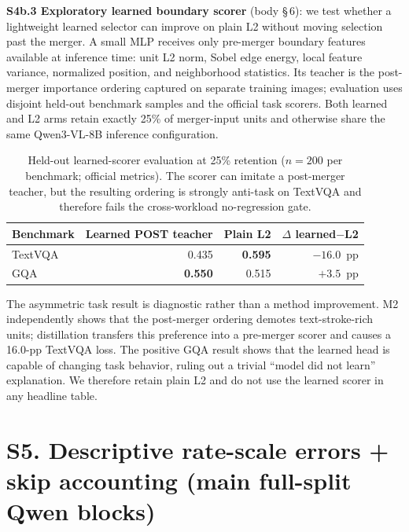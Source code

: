 \noindent\textbf{S4b.3 Exploratory learned boundary scorer} (body \S\,6):
we test whether a lightweight learned selector can improve on plain L2 without
moving selection past the merger. A small MLP receives only pre-merger
boundary features available at inference time: unit L2 norm, Sobel edge energy,
local feature variance, normalized position, and neighborhood statistics. Its
teacher is the post-merger importance ordering captured on separate training
images; evaluation uses disjoint held-out benchmark samples and the official
task scorers. Both learned and L2 arms retain exactly 25\% of merger-input
units and otherwise share the same Qwen3-VL-8B inference configuration.

\begin{table}[ht]
  \centering
  \small
  \begin{tabular}{@{}l r r r@{}}
    \toprule
    Benchmark & Learned POST teacher & Plain L2 & $\Delta$ learned$-$L2 \\
    \midrule
    TextVQA & 0.435 & \textbf{0.595} & $-16.0$~pp \\
    GQA     & \textbf{0.550} & 0.515 & $+3.5$~pp \\
    \bottomrule
  \end{tabular}
  \caption{Held-out learned-scorer evaluation at 25\% retention
  ($n=200$ per benchmark; official metrics). The scorer can imitate a
  post-merger teacher, but the resulting ordering is strongly anti-task on
  TextVQA and therefore fails the cross-workload no-regression gate.}
  \label{tab:supp_learned}
\end{table}

The asymmetric task result is diagnostic rather than a method improvement.
M2 independently shows that the post-merger ordering demotes
text-stroke-rich units; distillation transfers this preference into a
pre-merger scorer and causes a 16.0-pp TextVQA loss. The positive GQA result
shows that the learned head is capable of changing task behavior, ruling out a
trivial ``model did not learn'' explanation. We therefore retain plain L2 and
do not use the learned scorer in any headline table.

\section*{S5. Descriptive rate-scale errors + skip accounting (main full-split Qwen blocks)}

